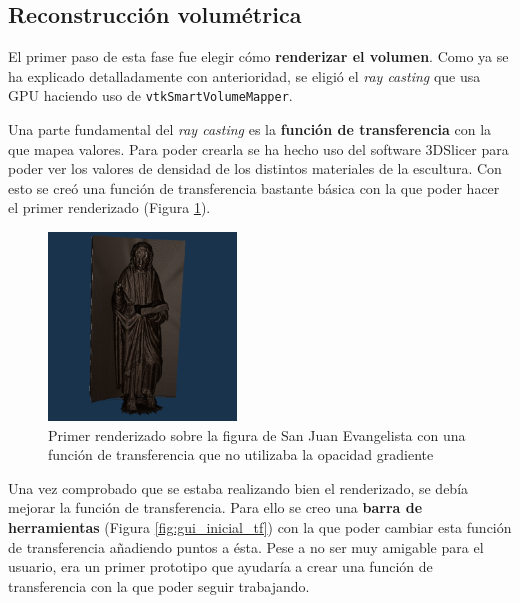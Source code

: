 \subsection{Reconstrucción volumétrica}

El primer paso de esta fase fue elegir cómo \textbf{renderizar el volumen}. Como ya se ha explicado detalladamente con anterioridad, se eligió el \textit{ray casting} que usa GPU haciendo uso de \texttt{vtkSmartVolumeMapper}.

Una parte fundamental del \textit{ray casting} es la \textbf{función de transferencia} con la que mapea valores. Para poder crearla se ha hecho uso del software 3DSlicer \cite{slicer} para poder ver los valores de densidad de los distintos materiales de la escultura. Con esto se creó una función de transferencia bastante básica con la que poder hacer el primer renderizado (Figura  \ref{fig:primer_renderizado}).

\begin{figure}[H]
	\centering
	\includegraphics[width=5cm]{imagenes/primer_renderizado}
	\caption{Primer renderizado sobre la figura de San Juan Evangelista con una función de transferencia que no utilizaba la opacidad gradiente}
	\label{fig:primer_renderizado}
\end{figure}

Una vez comprobado que se estaba realizando bien el renderizado, se debía mejorar la función de transferencia. Para ello se creo una \textbf{barra de herramientas} (Figura \ref{fig:gui_inicial_tf}) con la que poder cambiar esta función de transferencia añadiendo puntos a ésta. Pese a no ser muy amigable para el usuario, era un primer prototipo que ayudaría a crear una función de transferencia con la que poder seguir trabajando.

